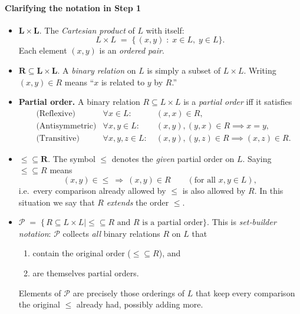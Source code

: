 \documentclass[12pt]{article}
\theoremstyle{definition} %
\theoremstyle{plain} %
\begin{document}
    \paragraph{Clarifying the notation in Step 1}

\begin{itemize}
  \item \(\boldsymbol{L\times L}\).  
        The \emph{Cartesian product} of \(L\) with itself:  
        \[
          L\times L \;=\;
          \bigl\{\, (x,y)\; :\; x\in L,\; y\in L \bigr\}.
        \]
        Each element \((x,y)\) is an \emph{ordered pair}.

  \item \(\boldsymbol{R\subseteq L\times L}\).  
        A \emph{binary relation} on \(L\) is simply a subset of
        \(L\times L\).
        Writing \((x,y)\in R\) means “\(x\) is related to \(y\) by \(R\).”

  \item \textbf{Partial order.}  
        A binary relation \(R\subseteq L\times L\) is a
        \emph{partial order} iff it satisfies
        \begin{align*}
           &\text{(Reflexive)}      &\forall x\in L\!: &\ (x,x)\in R,\\
           &\text{(Antisymmetric)}  &\forall x,y\in L\!: &\
                                     (x,y),(y,x)\in R\implies x=y,\\
           &\text{(Transitive)}     &\forall x,y,z\in L\!: &\
                                     (x,y),(y,z)\in R\implies (x,z)\in R.
        \end{align*}

  \item \(\boldsymbol{\le\subseteq R}\).  
        The symbol \(\le\) denotes the \emph{given} partial order on \(L\).
        Saying \(\le\subseteq R\) means
        \[
          (x,y)\in \le\ \Longrightarrow\ (x,y)\in R
          \qquad(\text{for all }x,y\in L),
        \]
        i.e.\ every comparison already allowed by \(\le\)
        is also allowed by \(R\).
        In this situation we say that \(R\) \emph{extends} the order \(\le\).

  \item \(\displaystyle
          \mathcal P \;=\;
          \bigl\{\,R\subseteq L\times L \mid \le\subseteq R
                 \text{ and } R\text{ is a partial order}\bigr\}.
        \)
        This is \emph{set‑builder notation}:
        \(\mathcal P\) collects \emph{all} binary relations \(R\)
        on \(L\) that
        \begin{enumerate}[label=\textbullet, leftmargin=1.5em]
          \item contain the original order (\(\le\subseteq R\)), and
          \item are themselves partial orders.
        \end{enumerate}
        Elements of \(\mathcal P\) are precisely those orderings of \(L\)
        that keep every comparison the original \(\le\) already had,
        possibly adding more.
\end{itemize}
\end{document}
